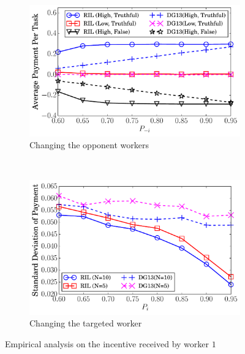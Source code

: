 \documentclass{article}
\begin{document}
\begin{figure}[t]
\begin{subfigure}[t]{0.24\textwidth}
        \includegraphics[width=\textwidth]{image/BPP2}
        \caption{\label{BPP2}Changing the opponent workers}
    \end{subfigure}
        ~
    \begin{subfigure}[t]{0.24\textwidth}
        \centering
        \includegraphics[width=\textwidth]{image/BPP3}
        \caption{\label{BPP3}Changing the targeted worker}
    \end{subfigure}
    \caption{\label{BPP}Empirical analysis on the incentive received by worker $1$}
\end{figure}
\end{document}
